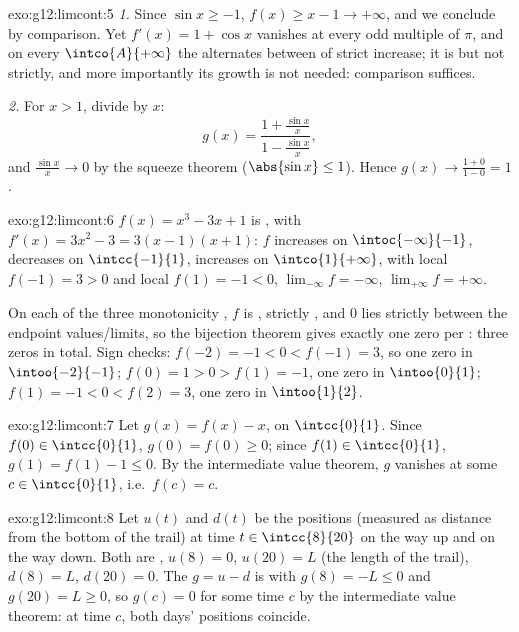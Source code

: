 \begin{solution}{exo:g12:limcont:5}
\emph{1.} Since $\sin x \geq -1$, $f(x) \geq x - 1 \to +\infty$, and we
conclude by comparison. Yet $f'(x) = 1 + \cos x$ vanishes at every odd
multiple of $\pi$, and on every  $\intco{A}{+\infty}$ the 
alternates between  of strict increase; it is  but not
strictly, and more importantly its growth is not needed: comparison suffices.

\emph{2.} For $x > 1$, divide by $x$:
\[
g(x) = \frac{1 + \frac{\sin x}{x}}{1 - \frac{\sin x}{x}},
\]
and $\frac{\sin x}{x} \to 0$ by the squeeze theorem
($\abs{\sin x} \leq 1$). Hence $g(x) \to \frac{1+0}{1-0} = 1$.
\end{solution}

\begin{solution}{exo:g12:limcont:6}
$f(x) = x^3 - 3x + 1$ is , with $f'(x) = 3x^2 - 3 = 3(x-1)(x+1)$:
$f$ increases on $\intoc{-\infty}{-1}$, decreases on $\intcc{-1}{1}$,
increases on $\intco{1}{+\infty}$, with local  $f(-1) = 3 > 0$ and
local  $f(1) = -1 < 0$, $\lim_{-\infty} f = -\infty$,
$\lim_{+\infty} f = +\infty$.

On each of the three monotonicity , $f$ is , strictly
, and $0$ lies strictly between the endpoint values/limits, so the
bijection theorem gives exactly one zero per : three zeros in total.
Sign checks: $f(-2) = -1 < 0 < f(-1) = 3$, so one zero in
$\intoo{-2}{-1}$; $f(0) = 1 > 0 > f(1) = -1$, one zero in $\intoo{0}{1}$;
$f(1) = -1 < 0 < f(2) = 3$, one zero in $\intoo{1}{2}$.
\end{solution}

\begin{solution}{exo:g12:limcont:7}
Let $g(x) = f(x) - x$,  on $\intcc{0}{1}$. Since
$f(0) \in \intcc{0}{1}$, $g(0) = f(0) \geq 0$; since $f(1) \in \intcc{0}{1}$,
$g(1) = f(1) - 1 \leq 0$. By the intermediate value theorem, $g$ vanishes at
some $c \in \intcc{0}{1}$, i.e.\ $f(c) = c$.
\end{solution}

\begin{solution}{exo:g12:limcont:8}
Let $u(t)$ and $d(t)$ be the positions (measured as distance from the bottom
of the trail) at time $t \in \intcc{8}{20}$ on the way up and on the way
down. Both are , $u(8) = 0$, $u(20) = L$ (the length of the trail),
$d(8) = L$, $d(20) = 0$. The  $g = u - d$ is  with
$g(8) = -L \leq 0$ and $g(20) = L \geq 0$, so $g(c) = 0$ for some time $c$ by
the intermediate value theorem: at time $c$, both days' positions coincide.
\end{solution}

